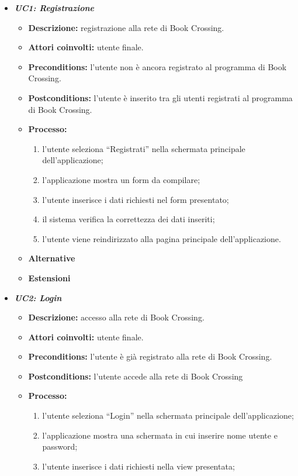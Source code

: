 

\begin{itemize}
	\item \textbf{\textit{UC1: Registrazione}}
	\begin{itemize}
		\item \textbf{Descrizione:} registrazione alla rete di Book Crossing.
		\item \textbf{Attori coinvolti:} utente finale.
		\item \textbf{Preconditions:} l’utente non è ancora registrato al programma di Book Crossing.
		\item \textbf{Postconditions:} l’utente è inserito tra gli utenti registrati al programma di Book Crossing.
		\item \textbf{Processo:}
		\begin{enumerate}
			\item l’utente seleziona “Registrati” nella schermata principale dell’applicazione;
			\item l’applicazione mostra un form da compilare;
			\item l’utente inserisce i dati richiesti nel form presentato;
			\item il sistema verifica la correttezza dei dati inseriti;
			\item l’utente viene reindirizzato alla pagina principale dell’applicazione.
		\end{enumerate}
		\item \textbf{Alternative}
		\item \textbf{Estensioni}
	\end{itemize}
	\item \textbf{\textit{UC2: Login}}
	\begin{itemize}
		\item \textbf{Descrizione:} accesso alla rete di Book Crossing.
		\item \textbf{Attori coinvolti:} utente finale. 
		\item \textbf{Preconditions:} l’utente è già registrato alla rete di Book Crossing.
		\item \textbf{Postconditions:} l’utente accede alla rete di Book Crossing
		\item \textbf{Processo:}
		\begin{enumerate}
			\item l’utente seleziona “Login” nella schermata principale dell’applicazione;
			\item l’applicazione mostra una schermata in cui inserire nome utente e password;
			\item l’utente inserisce i dati richiesti nella view presentata;

\end{enumerate}
\end{itemize}
\end{itemize}
